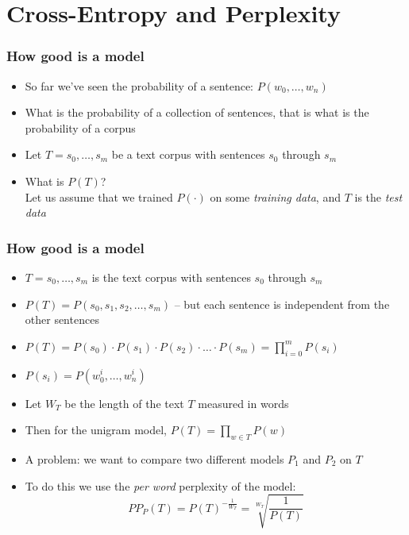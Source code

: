 \documentclass{beamer}
\begin{document}
\section{Cross-Entropy and Perplexity}
\frame{\tableofcontents[currentsection]}

\begin{frame}
\frametitle{How good is a model}
\begin{itemize}[<+->]
\item So far we've seen the probability of a sentence: $P(w_0, \ldots, w_n)$
\item What is the probability of a collection of sentences, that is what is the probability of a corpus
\item Let $T = s_0, \ldots, s_m$ be a text corpus with sentences $s_0$ through $s_m$
\item What is $P(T)$? \\
Let us assume that we trained $P(\cdot)$ on some {\em training data}, and $T$ is the {\em test data}
\end{itemize}
\end{frame}

\begin{frame}
\frametitle{How good is a model}
\begin{itemize}[<+->]
\item $T = s_0, \ldots, s_m$ is the text corpus with sentences $s_0$ through $s_m$
\item $P(T) = P(s_0, s_1, s_2, \ldots, s_m)$ -- but each sentence is independent from the other sentences
\item $P(T) = P(s_0) \cdot P(s_1) \cdot P(s_2) \cdot \ldots \cdot P(s_m) = \prod_{i=0}^m P(s_i)$ 
\item $P(s_i) = P(w_0^i, \ldots, w_n^i)$ 
\item Let $W_T$ be the length of the text $T$ measured in words
\item Then for the unigram model, $P(T) = \prod_{w \in T} P(w)$
\item A problem: we want to compare two different models $P_1$ and $P_2$ on $T$
\item To do this we use the {\em per word} perplexity of the model:
\[ \textit{PP}_P(T) = P(T)^{- \frac{1}{W_T}} = \sqrt[W_T]{\frac{1}{P(T)}} \]
\end{itemize}
\end{frame}
\end{document}
